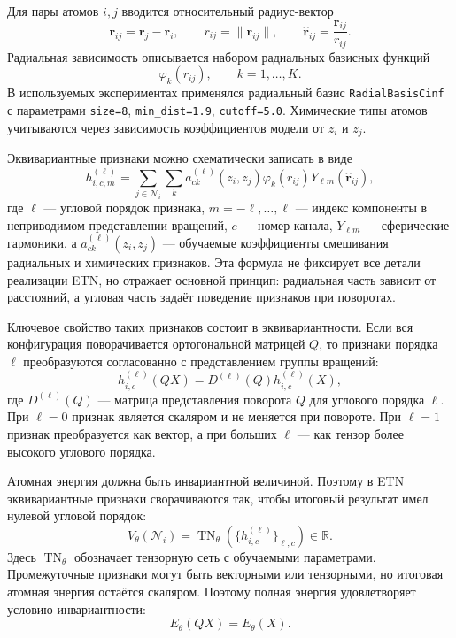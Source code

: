 Для пары атомов \(i,j\) вводится относительный радиус-вектор
\begin{equation}
    \mathbf r_{ij}
    =
    \mathbf r_j - \mathbf r_i,
    \qquad
    r_{ij}
    =
    \|\mathbf r_{ij}\|,
    \qquad
    \widehat{\mathbf r}_{ij}
    =
    \frac{\mathbf r_{ij}}{r_{ij}}.
\end{equation}
Радиальная зависимость описывается набором радиальных базисных функций
\begin{equation}
    \varphi_k(r_{ij}),
    \qquad
    k=1,\ldots,K.
\end{equation}
В используемых экспериментах применялся радиальный базис \texttt{RadialBasisCinf} с параметрами \texttt{size=8}, \texttt{min\_dist=1.9}, \texttt{cutoff=5.0}. Химические типы атомов учитываются через зависимость коэффициентов модели от \(z_i\) и \(z_j\).

Эквивариантные признаки можно схематически записать в виде
\begin{equation}
    h^{(\ell)}_{i,c,m}
    =
    \sum_{j\in \mathcal N_i}
    \sum_{k}
    a^{(\ell)}_{c k}(z_i,z_j)
    \varphi_k(r_{ij})
    Y_{\ell m}(\widehat{\mathbf r}_{ij}),
\end{equation}
где \(\ell\) --- угловой порядок признака, \(m=-\ell,\ldots,\ell\) --- индекс компоненты в неприводимом представлении вращений, \(c\) --- номер канала, \(Y_{\ell m}\) --- сферические гармоники, а \(a^{(\ell)}_{c k}(z_i,z_j)\) --- обучаемые коэффициенты смешивания радиальных и химических признаков. Эта формула не фиксирует все детали реализации ETN, но отражает основной принцип: радиальная часть зависит от расстояний, а угловая часть задаёт поведение признаков при поворотах.

Ключевое свойство таких признаков состоит в эквивариантности. Если вся конфигурация поворачивается ортогональной матрицей \(Q\), то признаки порядка \(\ell\) преобразуются согласованно с представлением группы вращений:
\begin{equation}
    h^{(\ell)}_{i,c}(QX)
    =
    D^{(\ell)}(Q)
    h^{(\ell)}_{i,c}(X),
\end{equation}
где \(D^{(\ell)}(Q)\) --- матрица представления поворота \(Q\) для углового порядка \(\ell\). При \(\ell=0\) признак является скаляром и не меняется при повороте. При \(\ell=1\) признак преобразуется как вектор, а при больших \(\ell\) --- как тензор более высокого углового порядка.

Атомная энергия должна быть инвариантной величиной. Поэтому в ETN эквивариантные признаки сворачиваются так, чтобы итоговый результат имел нулевой угловой порядок:
\begin{equation}
    V_\theta(\mathcal N_i)
    =
    \operatorname{TN}_\theta
    \left(
        \{h^{(\ell)}_{i,c}\}_{\ell,c}
    \right)
    \in \mathbb R.
\end{equation}
Здесь \(\operatorname{TN}_\theta\) обозначает тензорную сеть с обучаемыми параметрами. Промежуточные признаки могут быть векторными или тензорными, но итоговая атомная энергия остаётся скаляром. Поэтому полная энергия удовлетворяет условию инвариантности:
\begin{equation}
    E_\theta(QX)
    =
    E_\theta(X).
\end{equation}

